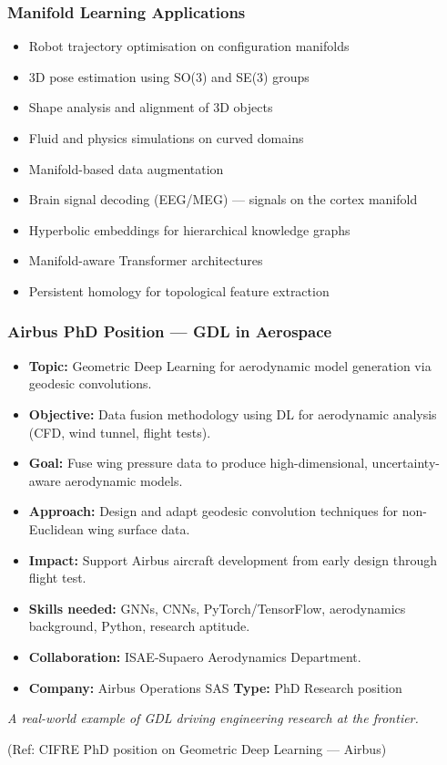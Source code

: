 \begin{frame}[fragile]\frametitle{Manifold Learning Applications}

  \begin{itemize}
    \item Robot trajectory optimisation on configuration manifolds
    \item 3D pose estimation using SO(3) and SE(3) groups
    \item Shape analysis and alignment of 3D objects
    \item Fluid and physics simulations on curved domains
    \item Manifold-based data augmentation
    \item Brain signal decoding (EEG/MEG) --- signals on the cortex manifold
    \item Hyperbolic embeddings for hierarchical knowledge graphs
    \item Manifold-aware Transformer architectures
    \item Persistent homology for topological feature extraction
  \end{itemize}

\end{frame}

\begin{frame}[fragile]\frametitle{Airbus PhD Position --- GDL in Aerospace}

  \begin{itemize}
    \item \textbf{Topic:} Geometric Deep Learning for aerodynamic model generation via geodesic convolutions.
    \item \textbf{Objective:} Data fusion methodology using DL for aerodynamic analysis (CFD, wind tunnel, flight tests).
    \item \textbf{Goal:} Fuse wing pressure data to produce high-dimensional, uncertainty-aware aerodynamic models.
    \item \textbf{Approach:} Design and adapt geodesic convolution techniques for non-Euclidean wing surface data.
    \item \textbf{Impact:} Support Airbus aircraft development from early design through flight test.
    \item \textbf{Skills needed:} GNNs, CNNs, PyTorch/TensorFlow, aerodynamics background, Python, research aptitude.
    \item \textbf{Collaboration:} ISAE-Supaero Aerodynamics Department.
    \item \textbf{Company:} Airbus Operations SAS \quad \textbf{Type:} PhD Research position
  \end{itemize}

  \vspace{0.2cm}
  {\em A real-world example of GDL driving engineering research at the frontier.}

  {\tiny (Ref: CIFRE PhD position on Geometric Deep Learning --- Airbus)}

\end{frame}
